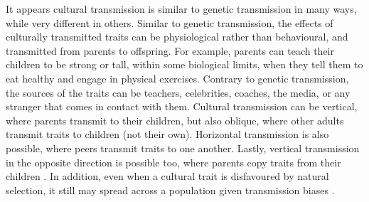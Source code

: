 \documentclass[11pt]{article}
\begin{document}
It appears cultural transmission is similar to genetic transmission in many ways, while very different in others. %
Similar to genetic transmission, the effects of culturally transmitted traits can be physiological rather than behavioural, and transmitted from parents to offspring.%
 For example, parents can teach their children to be strong or tall, within some biological limits, when they tell them to eat healthy and engage in physical exercises. %
Contrary to genetic transmission, the sources of the traits can be teachers, celebrities, coaches, the media, or any stranger that comes in contact with them. %
 Cultural transmission can be vertical, where parents transmit to their children, but also oblique, where other adults transmit traits to children (not their own). %
  Horizontal transmission is also possible, where peers transmit traits to one another. %
   Lastly, vertical transmission in the opposite direction is possible too, where parents copy traits from their children \citep{transmissionVectorsBook, transmissionVectors}. %
In addition, even when a cultural trait is disfavoured by natural selection, it still may spread across a population given transmission biases \citep[Ch. 8 pg. 279]{evolutionBook}.\\ %
\end{document}
